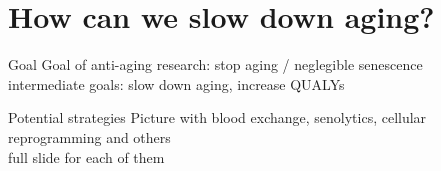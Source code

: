 \section{How can we slow down aging?}


\begin{frame}[c]{Goal}
    Goal of anti-aging research: stop aging / neglegible senescence \\
    intermediate goals: slow down aging, increase QUALYs
\end{frame}


\begin{frame}[c]{Potential strategies}
    Picture with blood exchange, senolytics, cellular reprogramming and others \\
    full slide for each of them
\end{frame}


